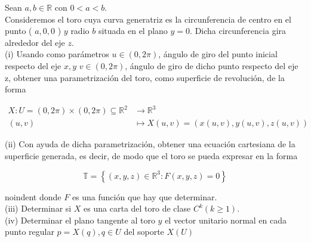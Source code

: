 \documentclass[10pt]{article}
\begin{document}
Sean $a, b \in \mathbb{R}$ con $0<a<b$.\\
Consideremos el toro cuya curva generatriz es la circunferencia de centro en el punto ( $a, 0,0$ ) $y$ radio $b$ situada en el plano $y=0$. Dicha circunferencia gira alrededor del eje $z$.\\
(i) Usando como parámetros $u \in(0,2 \pi)$, ángulo de giro del punto inicial respecto del eje $x, y$ $v \in(0,2 \pi)$, ángulo de giro de dicho punto respecto del eje z, obtener una parametrización del toro, como superficie de revolución, de la forma

$$
\begin{aligned}
X: U=(0,2 \pi) \times(0,2 \pi) \subseteq \mathbb{R}^{2} & \longrightarrow \mathbb{R}^{3} \\
(u, v) & \longmapsto X(u, v)=(x(u, v), y(u, v), z(u, v))
\end{aligned}
$$

(ii) Con ayuda de dicha parametrización, obtener una ecuación cartesiana de la superficie generada, es decir, de modo que el toro se pueda expresar en la forma

$$
\mathbb{T}=\left\{(x, y, z) \in \mathbb{R}^{3}: F(x, y, z)=0\right\}
$$

noindent donde $F$ es una función que hay que determinar.\\
(iii) Determinar si $X$ es una carta del toro de clase $C^{k}(k \geq 1)$.\\
(iv) Determinar el plano tangente al toro $y$ el vector unitario normal en cada punto regular $p=X(q), q \in U$ del soporte $X(U)$
\end{document}
